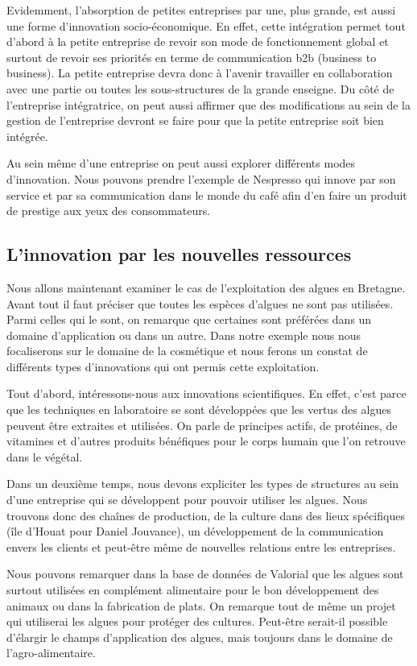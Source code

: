 \documentclass[a4paper,12pt]{report}
\begin{document}
			Evidemment, l’absorption de petites entreprises par une, plus grande, est aussi une forme d’innovation socio-économique. En effet, cette intégration permet tout d’abord à la petite entreprise de revoir son mode de fonctionnement global et surtout de revoir ses priorités en terme de communication b2b (business to business). La petite entreprise devra donc à l’avenir travailler en collaboration avec une partie ou toutes les sous-structures de la grande enseigne.
			Du côté de l’entreprise intégratrice, on peut aussi affirmer que des modifications au sein de la gestion de l’entreprise devront se faire pour que la petite entreprise soit bien intégrée. 
			
			Au sein même d’une entreprise on peut aussi explorer différents modes d’innovation. Nous pouvons prendre l’exemple de Nespresso qui innove par son service et par sa communication dans le monde du café afin d’en faire un produit de prestige aux yeux des consommateurs.
				
		\subsection{L'innovation par les nouvelles ressources}
			Nous allons maintenant examiner le cas de l’exploitation des algues en Bretagne.
			Avant tout il faut préciser que toutes les espèces d’algues ne sont pas utilisées. Parmi celles qui le sont, on remarque que certaines sont préférées dans un domaine d’application ou dans un autre. Dans notre exemple nous nous focaliserons sur le domaine de la cosmétique et nous ferons un constat de différents types d’innovations qui ont permis cette exploitation.
			
			Tout d’abord, intéressons-nous aux innovations scientifiques. En effet, c’est parce que les techniques en laboratoire se sont développées que les vertus des algues peuvent être extraites et utilisées. On parle de principes actifs, de protéines, de vitamines et d’autres produits bénéfiques pour le corps humain que l’on retrouve dans le végétal.
			
			Dans un deuxième temps, nous devons expliciter les types de structures au sein d’une entreprise qui se développent pour pouvoir utiliser les algues. Nous trouvons donc des chaînes de production, de la culture dans des lieux spécifiques (île d’Houat pour Daniel Jouvance)\cite{Algues}, un développement de la communication envers les clients et peut-être même de nouvelles relations entre les entreprises.
			
			Nous pouvons remarquer dans la base de données de Valorial que les algues sont surtout utilisées en complément alimentaire pour le bon développement des animaux ou dans la fabrication de plats. On remarque tout de même un projet qui utiliserai les algues pour protéger des cultures. Peut-être serait-il possible d’élargir le champs d’application des algues, mais toujours dans le domaine de l’agro-alimentaire. 
			
\end{document}

